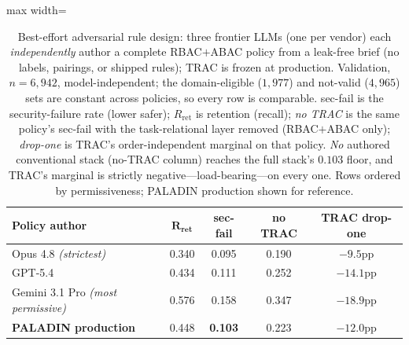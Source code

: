 \documentclass[sigconf,review,anonymous]{acmart}
\begin{document}
\begin{table}[!t]
\centering
\caption{Best-effort adversarial rule design: three frontier LLMs (one per vendor) each \emph{independently} author a complete RBAC$+$ABAC policy from a leak-free brief (no labels, pairings, or shipped rules); TRAC is frozen at production. Validation, $n=6{,}942$, model-independent; the domain-eligible ($1{,}977$) and not-valid ($4{,}965$) sets are constant across policies, so every row is comparable. sec-fail is the security-failure rate (lower safer); $R_{\text{ret}}$ is retention (recall); \emph{no TRAC} is the same policy's sec-fail with the task-relational layer removed (RBAC$+$ABAC only); \emph{drop-one} is TRAC's order-independent marginal on that policy. \emph{No} authored conventional stack (no-TRAC column) reaches the full stack's $0.103$ floor, and TRAC's marginal is strictly negative---load-bearing---on every one. Rows ordered by permissiveness; PALADIN production shown for reference.}
\label{tab:llm_authored}
\footnotesize
\setlength{\tabcolsep}{5pt}
\begin{adjustbox}{max width=\columnwidth}
\begin{tabular}{@{}lcccc@{}}
\toprule
\textbf{Policy author} & $\mathbf{R_{\text{ret}}}$ & \textbf{sec-fail} & \textbf{no TRAC} & \textbf{TRAC drop-one} \\
\midrule
Opus 4.8 \textit{(strictest)}  & 0.340 & 0.095 & 0.190 & $-9.5$pp \\
GPT-5.4                        & 0.434 & 0.111 & 0.252 & $-14.1$pp \\
Gemini 3.1 Pro \textit{(most permissive)} & 0.576 & 0.158 & 0.347 & $-18.9$pp \\
\midrule
\textbf{PALADIN production}    & 0.448 & \textbf{0.103} & 0.223 & $-12.0$pp \\
\bottomrule
\end{tabular}
\end{adjustbox}
\end{table}
\end{document}

